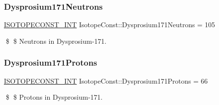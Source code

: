 \subsubsection{\texorpdfstring{Dysprosium171\+Neutrons}{Dysprosium171Neutrons}}
{\footnotesize\ttfamily \mbox{\hyperlink{group___isotope_const-_macros_ga5f18360b3e99483a35c32d789e62621c}{I\+S\+O\+T\+O\+P\+E\+C\+O\+N\+S\+T\+\_\+\+I\+NT}} Isotope\+Const\+::\+Dysprosium171\+Neutrons = 105}

\$ \$ Neutrons in Dysprosium-\/171. \mbox{\label{group___isotope_const-_dysprosium-_dy171_gac4c5e2db60372df765a6f7c75164a69c}} 
\subsubsection{\texorpdfstring{Dysprosium171\+Protons}{Dysprosium171Protons}}
{\footnotesize\ttfamily \mbox{\hyperlink{group___isotope_const-_macros_ga5f18360b3e99483a35c32d789e62621c}{I\+S\+O\+T\+O\+P\+E\+C\+O\+N\+S\+T\+\_\+\+I\+NT}} Isotope\+Const\+::\+Dysprosium171\+Protons = 66}

\$ \$ Protons in Dysprosium-\/171. 